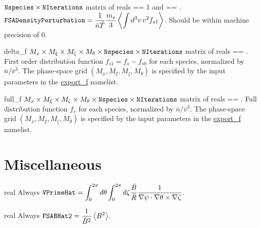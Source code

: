 \myhrule

{$\text{\ttfamily Nspecies} \times \text{\ttfamily NIterations}$ matrix of reals}
{ == 1 and  == \true.}
{$\displaystyle \text{\ttfamily FSADensityPerturbation} =  \frac{1}{\bar{n} \bar{T}} \frac{m_s}{3} \left\langle \int d^3v \, v^2 f_{s1} \right\rangle$. 
Should be within machine precision of 0.}

\myhrule

{delta_f}
{$M_x \times M_{\xi} \times M_{\zeta} \times M_{\theta} \times \text{\ttfamily Nspecies} \times \text{\ttfamily NIterations}$ matrix of reals}
{ == \true.}
{First order distribution function $f_{s1} = f_{s} - f_{s0}$ for each species, normalized by $\bar{n} / \bar{v}^3$. 
The phase-space grid $\left(M_x, M_{\xi}, M_{\zeta}, M_{\theta}\right)$} is specified by the input parameters in the {\ttfamily \hyperref[sec:exportfParameters]{export\_f}} namelist. 

\myhrule

{full_f}
{$M_x \times M_{\xi} \times M_{\zeta} \times M_{\theta} \times \text{\ttfamily Nspecies} \times \text{\ttfamily NIterations}$ matrix of reals}
{ == \true.}
{Full distribution function $f_{s}$ for each species, normalized by $\bar{n} / \bar{v}^3$. 
The phase-space grid $\left(M_x, M_{\xi}, M_{\zeta}, M_{\theta}\right)$} is specified by the input parameters in the {\ttfamily \hyperref[sec:exportfParameters]{export\_f}} namelist. 

\myhrule

\section{Miscellaneous}

\myhrule

{real}
{Always}
{$\displaystyle \text{\ttfamily VPrimeHat} =  \int_{0}^{2 \pi} d \theta \int_{0}^{2 \pi} d \zeta \frac{\bar{B}}{\bar{R}} \frac{1}{\nabla \psi \cdot \nabla \theta \times \nabla \zeta}$.}

\myhrule

{real}
{Always}
{$\displaystyle \text{\ttfamily FSABHat2} =  \frac{1}{\bar{B}^2} \left\langle B^2 \right\rangle$.}

\myhrule

%
%
%

